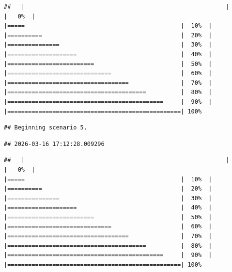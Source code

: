 \documentclass[
]{article}
\begin{document}
\begin{verbatim}
##   |                                                          |                                                  |   0%  |                                                          |=====                                             |  10%  |                                                          |==========                                        |  20%  |                                                          |===============                                   |  30%  |                                                          |====================                              |  40%  |                                                          |=========================                         |  50%  |                                                          |==============================                    |  60%  |                                                          |===================================               |  70%  |                                                          |========================================          |  80%  |                                                          |=============================================     |  90%  |                                                          |==================================================| 100%
\end{verbatim}

\begin{verbatim}
## Beginning scenario 5.
\end{verbatim}

\begin{verbatim}
## 2026-03-16 17:12:28.009296
\end{verbatim}

\begin{verbatim}
##   |                                                          |                                                  |   0%  |                                                          |=====                                             |  10%  |                                                          |==========                                        |  20%  |                                                          |===============                                   |  30%  |                                                          |====================                              |  40%  |                                                          |=========================                         |  50%  |                                                          |==============================                    |  60%  |                                                          |===================================               |  70%  |                                                          |========================================          |  80%  |                                                          |=============================================     |  90%  |                                                          |==================================================| 100%
\end{verbatim}
\end{document}
